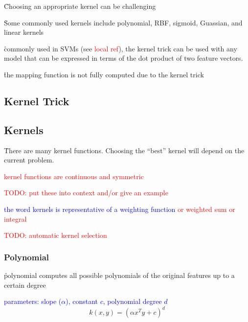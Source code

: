 
\r{Choosing an appropriate kernel can be challenging}


\r{Some commonly used kernels include polynomial, RBF, sigmoid, Guassian, and linear kernels}

\r{commonly used in SVMs (see \textcolor{red}{local ref}), the kernel trick can be used with any model that can be expressed in terms of the dot product of two feature vectors.}

\r{the mapping function is not fully computed due to the kernel trick}

\subsection{Kernel Trick}

\subsection{Kernels}

\r{There are many kernel functions. Choosing the ``best'' kernel will depend on the current problem.}

\textcolor{red}{kernel functions are continuous and symmetric}

\textcolor{red}{TODO: put these into context and/or give an example}

\textcolor{blue}{the word kernels is representative of a weighting function \textcolor{red}{or weighted sum or integral}}



\textcolor{red}{TODO: automatic kernel selection}

\subsubsection{Polynomial}

\r{polynomial computes all possible polynomials of the original features up to a certain degree}

\textcolor{blue}{parameters: slope ($\alpha$), constant $c$, polynomial degree $d$}
\begin{equation}
{k(x, y) = (\alpha x^T y + c)^d}
\label{eq:kernel_polynomial_eq}
\end{equation}


